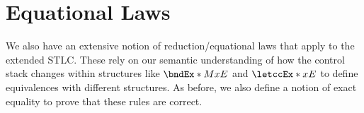 \documentclass[letterpaper]{article}
\begin{document}
\section{Equational Laws}

We also have an extensive notion of reduction/equational laws that apply to the extended STLC.
These rely on our semantic understanding of how the control stack changes within structures like $\bndEx*{M}{x}{E}$ and $\letccEx*{x}{E}$ to define equivalences with different structures.
As before, we also define a notion of exact equality to prove that these rules are correct.
\end{document}
